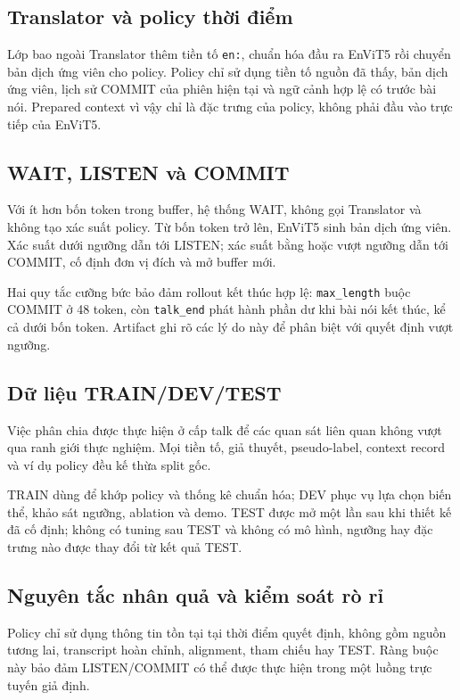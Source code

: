 \documentclass[11pt,a4paper]{article}
\numberwithin{figure}{section}
\numberwithin{table}{section}
\begin{document}
\subsection{Translator và policy thời điểm}
Lớp bao ngoài Translator thêm tiền tố \texttt{en:}, chuẩn hóa đầu ra EnViT5 rồi chuyển bản dịch ứng viên cho policy. Policy chỉ sử dụng tiền tố nguồn đã thấy, bản dịch ứng viên, lịch sử COMMIT của phiên hiện tại và ngữ cảnh hợp lệ có trước bài nói. Prepared context vì vậy chỉ là đặc trưng của policy, không phải đầu vào trực tiếp của EnViT5.

\subsection{WAIT, LISTEN và COMMIT}
Với ít hơn bốn token trong buffer, hệ thống WAIT, không gọi Translator và không tạo xác suất policy. Từ bốn token trở lên, EnViT5 sinh bản dịch ứng viên. Xác suất dưới ngưỡng dẫn tới LISTEN; xác suất bằng hoặc vượt ngưỡng dẫn tới COMMIT, cố định đơn vị đích và mở buffer mới.

Hai quy tắc cưỡng bức bảo đảm rollout kết thúc hợp lệ: \texttt{max\_length} buộc COMMIT ở 48 token, còn \texttt{talk\_end} phát hành phần dư khi bài nói kết thúc, kể cả dưới bốn token. Artifact ghi rõ các lý do này để phân biệt với quyết định vượt ngưỡng.

\subsection{Dữ liệu TRAIN/DEV/TEST}
Việc phân chia được thực hiện ở cấp talk để các quan sát liên quan không vượt qua ranh giới thực nghiệm. Mọi tiền tố, giả thuyết, pseudo-label, context record và ví dụ policy đều kế thừa split gốc.

TRAIN dùng để khớp policy và thống kê chuẩn hóa; DEV phục vụ lựa chọn biến thể, khảo sát ngưỡng, ablation và demo. TEST được mở một lần sau khi thiết kế đã cố định; không có tuning sau TEST và không có mô hình, ngưỡng hay đặc trưng nào được thay đổi từ kết quả TEST.

\subsection{Nguyên tắc nhân quả và kiểm soát rò rỉ}
Policy chỉ sử dụng thông tin tồn tại tại thời điểm quyết định, không gồm nguồn tương lai, transcript hoàn chỉnh, alignment, tham chiếu hay TEST. Ràng buộc này bảo đảm LISTEN/COMMIT có thể được thực hiện trong một luồng trực tuyến giả định.
\end{document}
